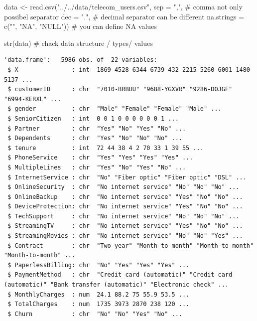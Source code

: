 \documentclass[
  letterpaper,
  DIV=11,
  numbers=noendperiod]{scrreprt}
\newenvironment{Shaded}{\begin{snugshade}}{\end{snugshade}}
\newcommand{\AttributeTok}[1]{\textcolor[rgb]{0.40,0.45,0.13}{#1}}
\newcommand{\CommentTok}[1]{\textcolor[rgb]{0.37,0.37,0.37}{#1}}
\newcommand{\FunctionTok}[1]{\textcolor[rgb]{0.28,0.35,0.67}{#1}}
\newcommand{\NormalTok}[1]{\textcolor[rgb]{0.00,0.23,0.31}{#1}}
\newcommand{\OtherTok}[1]{\textcolor[rgb]{0.00,0.23,0.31}{#1}}
\newcommand{\StringTok}[1]{\textcolor[rgb]{0.13,0.47,0.30}{#1}}
\begin{document}
\begin{Shaded}
\begin{Highlighting}[]
\NormalTok{data }\OtherTok{\textless{}{-}} \FunctionTok{read.csv}\NormalTok{(}\StringTok{"../../data/telecom\_users.csv"}\NormalTok{,}
                  \AttributeTok{sep =} \StringTok{","}\NormalTok{, }\CommentTok{\# comma not only possibel separator}
                  \AttributeTok{dec =} \StringTok{"."}\NormalTok{, }\CommentTok{\# decimal separator can be different}
                  \AttributeTok{na.strings =} \FunctionTok{c}\NormalTok{(}\StringTok{""}\NormalTok{, }\StringTok{"NA"}\NormalTok{, }\StringTok{"NULL"}\NormalTok{)) }\CommentTok{\# you can define NA values}
\end{Highlighting}
\end{Shaded}

\begin{Shaded}
\begin{Highlighting}[]
\FunctionTok{str}\NormalTok{(data) }\CommentTok{\# chack data structure / types/ values}
\end{Highlighting}
\end{Shaded}

\begin{verbatim}
'data.frame':   5986 obs. of  22 variables:
 $ X               : int  1869 4528 6344 6739 432 2215 5260 6001 1480 5137 ...
 $ customerID      : chr  "7010-BRBUU" "9688-YGXVR" "9286-DOJGF" "6994-KERXL" ...
 $ gender          : chr  "Male" "Female" "Female" "Male" ...
 $ SeniorCitizen   : int  0 0 1 0 0 0 0 0 0 1 ...
 $ Partner         : chr  "Yes" "No" "Yes" "No" ...
 $ Dependents      : chr  "Yes" "No" "No" "No" ...
 $ tenure          : int  72 44 38 4 2 70 33 1 39 55 ...
 $ PhoneService    : chr  "Yes" "Yes" "Yes" "Yes" ...
 $ MultipleLines   : chr  "Yes" "No" "Yes" "No" ...
 $ InternetService : chr  "No" "Fiber optic" "Fiber optic" "DSL" ...
 $ OnlineSecurity  : chr  "No internet service" "No" "No" "No" ...
 $ OnlineBackup    : chr  "No internet service" "Yes" "No" "No" ...
 $ DeviceProtection: chr  "No internet service" "Yes" "No" "No" ...
 $ TechSupport     : chr  "No internet service" "No" "No" "No" ...
 $ StreamingTV     : chr  "No internet service" "Yes" "No" "No" ...
 $ StreamingMovies : chr  "No internet service" "No" "No" "Yes" ...
 $ Contract        : chr  "Two year" "Month-to-month" "Month-to-month" "Month-to-month" ...
 $ PaperlessBilling: chr  "No" "Yes" "Yes" "Yes" ...
 $ PaymentMethod   : chr  "Credit card (automatic)" "Credit card (automatic)" "Bank transfer (automatic)" "Electronic check" ...
 $ MonthlyCharges  : num  24.1 88.2 75 55.9 53.5 ...
 $ TotalCharges    : num  1735 3973 2870 238 120 ...
 $ Churn           : chr  "No" "No" "Yes" "No" ...
\end{verbatim}
\end{document}
